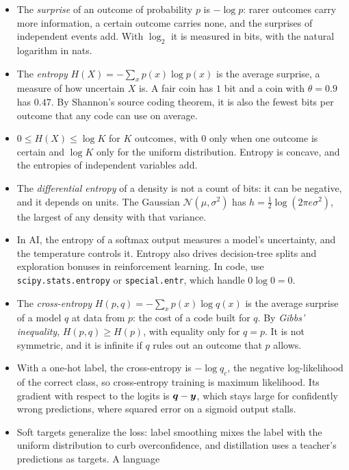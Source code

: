 \begin{itemize}
  \item The \emph{surprise} of an outcome of probability $p$ is $-\log p$:
    rarer outcomes carry more information, a certain outcome carries
    none, and the surprises of independent events add. With $\log_2$ it
    is measured in bits, with the natural logarithm in nats.
  \item The \emph{entropy} $H(X) = -\sum_x p(x) \log p(x)$ is the average
    surprise, a measure of how uncertain $X$ is. A fair coin has $1$ bit
    and a coin with $\theta = 0.9$ has $0.47$. By Shannon's source coding
    theorem, it is also the fewest bits per outcome that any code can
    use on average.
  \item $0 \le H(X) \le \log K$ for $K$ outcomes, with $0$ only when one
    outcome is certain and $\log K$ only for the uniform distribution.
    Entropy is concave, and the entropies of independent variables add.
  \item The \emph{differential entropy} of a density is not a count of
    bits: it can be negative, and it depends on units. The Gaussian
    $\mathcal{N}(\mu, \sigma^2)$ has $h = \tfrac12 \log(2\pi e \sigma^2)$,
    the largest of any density with that variance.
  \item In AI, the entropy of a softmax output measures a model's
    uncertainty, and the temperature controls it. Entropy also drives
    decision-tree splits and exploration bonuses in reinforcement
    learning. In code, use \texttt{scipy.stats.entropy} or
    \texttt{special.entr}, which handle $0 \log 0 = 0$.
  \item The \emph{cross-entropy} $H(p, q) = -\sum_x p(x) \log q(x)$ is the
    average surprise of a model $q$ at data from $p$: the cost of a code
    built for $q$. By \emph{Gibbs' inequality}, $H(p, q) \ge H(p)$, with
    equality only for $q = p$. It is not symmetric, and it is infinite
    if $q$ rules out an outcome that $p$ allows.
  \item With a one-hot label, the cross-entropy is $-\log q_c$, the
    negative log-likelihood of the correct class, so cross-entropy
    training is maximum likelihood. Its gradient with respect to the
    logits is $\bm{q} - \bm{y}$, which stays large for confidently
    wrong predictions, where squared error on a sigmoid output stalls.
  \item Soft targets generalize the loss: label smoothing mixes the label
    with the uniform distribution to curb overconfidence, and
    distillation uses a teacher's predictions as targets. A language

\end{itemize}
